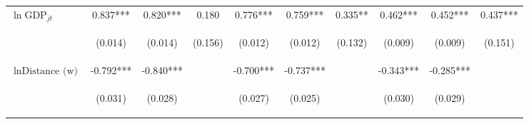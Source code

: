 \begin{center}
\begin{tabular}{lccccccccc}
$\ln\text{GDP}_{jt}$ & 0.837*** & 0.820*** & 0.180 & 0.776*** & 0.759*** & 0.335** & 0.462*** & 0.452*** & 0.437*** \\
\vspace{4pt} & \begin{footnotesize}(0.014)\end{footnotesize} & \begin{footnotesize}(0.014)\end{footnotesize} & \begin{footnotesize}(0.156)\end{footnotesize} & \begin{footnotesize}(0.012)\end{footnotesize} & \begin{footnotesize}(0.012)\end{footnotesize} & \begin{footnotesize}(0.132)\end{footnotesize} & \begin{footnotesize}(0.009)\end{footnotesize} & \begin{footnotesize}(0.009)\end{footnotesize} & \begin{footnotesize}(0.151)\end{footnotesize} \\
$\ln\text{Distance (w)}$ & -0.792*** & -0.840*** &  & -0.700*** & -0.737*** &  & -0.343*** & -0.285*** &  \\
\vspace{4pt} & \begin{footnotesize}(0.031)\end{footnotesize} & \begin{footnotesize}(0.028)\end{footnotesize} & \begin{footnotesize}\end{footnotesize} & \begin{footnotesize}(0.027)\end{footnotesize} & \begin{footnotesize}(0.025)\end{footnotesize} & \begin{footnotesize}\end{footnotesize} & \begin{footnotesize}(0.030)\end{footnotesize} & \begin{footnotesize}(0.029)\end{footnotesize} & \begin{footnotesize}\end{footnotesize} \\

\end{tabular}
\end{center}
